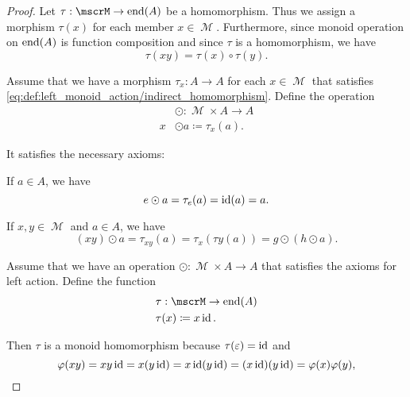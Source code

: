 \begin{proof}
   Let \( \tau: \mscrM \to \End(A) \) be a homomorphism. Thus we assign a morphism \( \tau(x) \) for each member \( x \in \mscrM \). Furthermore, since monoid operation on \( \operatorname{end}(A) \) is function composition and since \( \tau \) is a homomorphism, we have
  \begin{equation*}
    \tau(xy) = \tau(x) \circ \tau(y).
  \end{equation*}

   Assume that we have a morphism \( \tau_x: A \to A \) for each \( x \in \mscrM \) that satisfies \eqref{eq:def:left_monoid_action/indirect_homomorphism}. Define the operation
  \begin{align*}
    {}&\odot{}: \mscrM \times A \to A \\
    x &\odot a \coloneqq \tau_x(a).
  \end{align*}

  It satisfies the necessary axioms:
  \begin{reflist}
     If \( a \in A \), we have
    \begin{equation*}
      e \odot a
      =
      \tau_e(a)
      =
      \operatorname{id}(a)
      =
      a.
    \end{equation*}

     If \( x, y \in \mscrM \) and \( a \in A \), we have
    \begin{equation*}
      (x y) \odot a
      =
      \tau_{x y}(a)
      =
      \tau_{x}(\tau{y}(a))
      =
      g \odot (h \odot a).
    \end{equation*}
  \end{reflist}

   Assume that we have an operation \( \odot: \mscrM \times A \to A \) that satisfies the axioms for left action. Define the function
  \begin{align*}
    &\tau: \mscrM \to \End(A) \\
    &\tau(x) \coloneqq x \id.
  \end{align*}

  Then \( \tau \) is a monoid homomorphism because \( \tau(\varepsilon) = \operatorname{id} \) and
  \begin{equation}\label{def:left_monoid_action/homomorphism/proof}
    \varphi(xy)
    =
    xy \operatorname{id}
    =
    x (y \operatorname{id})
    =
    x \operatorname{id} (y \operatorname{id})
    =
    (x \operatorname{id}) (y \operatorname{id})
    =
    \varphi(x) \varphi(y),
  \end{equation}
\end{proof}

